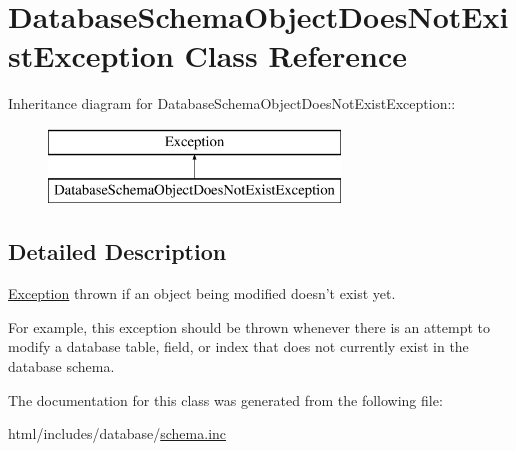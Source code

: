 \hypertarget{classDatabaseSchemaObjectDoesNotExistException}{
\section{DatabaseSchemaObjectDoesNotExistException Class Reference}
\label{classDatabaseSchemaObjectDoesNotExistException}
}
Inheritance diagram for DatabaseSchemaObjectDoesNotExistException::\begin{figure}[H]
\begin{center}
\leavevmode
\includegraphics[height=2cm]{classDatabaseSchemaObjectDoesNotExistException}
\end{center}
\end{figure}


\subsection{Detailed Description}
\hyperlink{classException}{Exception} thrown if an object being modified doesn't exist yet.

For example, this exception should be thrown whenever there is an attempt to modify a database table, field, or index that does not currently exist in the database schema. 

The documentation for this class was generated from the following file:\begin{DoxyCompactItemize}
\item 
html/includes/database/\hyperlink{schema_8inc}{schema.inc}\end{DoxyCompactItemize}
